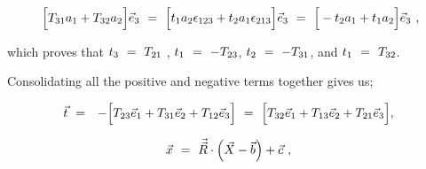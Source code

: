 \documentclass{article}
\newcounter{subsubsubsection}[subsubsection]
\begin{document}
\begin{equation} \label{eq:1}
\Big[ T_{3 1} a_1 + T_{3 2} a_2 \Big] \vec{e}_3 \hspace{0.125cm} = \hspace{0.125cm} \Big[ t_1 a_2 \epsilon_{1 2 3} + t_2 a_1 \epsilon_{2 1 3} \Big] \vec{e}_3 \hspace{0.125cm} = \hspace{0.125cm} \Big[ - t_2 a_1 + t_1 a_2  \Big] \vec{e}_3 \hspace{0.125cm} , 
\end{equation}

which proves that \begin{math}  t_3 \hspace{0.125cm} = \hspace{0.125cm} T_{2 1} \end{math} , \begin{math} t_1  \hspace{0.125cm} = \hspace{0.125cm} - T_{2 3} \end{math}, \begin{math} t_2 \hspace{0.125cm} = \hspace{0.125cm} - T_{3 1} \end{math}, and \begin{math}  t_1  \hspace{0.125cm} = \hspace{0.125cm} T_{3 2} \end{math}.

Consolidating all the positive and negative terms together gives us; 

\begin{equation} \label{eq:1}
\vec{t} \hspace{0.125cm} = \hspace{0.125cm}  \hspace{0.125cm} - \Big[ T_{2 3} \vec{e}_1 + T_{3 1} \vec{e}_2 + T_{1 2} \vec{e}_3 \Big]  \hspace{0.125cm} = \hspace{0.125cm}  \Big[ T_{3 2} \vec{e}_1 + T_{1 3} \vec{e}_2 + T_{2 1} \vec{e}_3 \Big]  ,  \hspace{0.125cm} 
\end{equation}


\begin{equation} \label{eq:1}
\vec{x} \hspace{0.125cm} = \hspace{0.125cm} \vec{\vec{R}} \cdot \Big( \vec{X} - \vec{b} \Big) + \vec{c} \hspace{0.125cm}  ,  \hspace{0.125cm} 
\end{equation}
\end{document}
